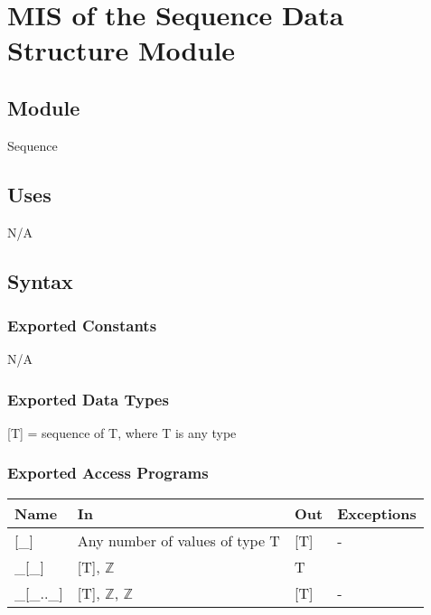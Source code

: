 \documentclass[12pt, titlepage]{article}
\begin{document}

\section{MIS of the Sequence Data Structure Module} \label{sec:SequenceData}

\subsection{Module}
Sequence

\subsection{Uses}

N/A

\subsection{Syntax}

\subsubsection{Exported Constants}
N/A

\subsubsection{Exported Data Types}

[T] = sequence of T, where T is any type

\subsubsection{Exported Access Programs}

\begin{center}
	\renewcommand*{\arraystretch}{1.5}
	\begin{tabular} {p{}  p{}  p{} 
			p{} } \hline 
		\textbf{Name} & \textbf{In} & \textbf{Out} & \textbf{Exceptions} \\ 
		\hline
		
		[\_] & Any number of values of type T & [T] & - \\ 
		\_[\_] & [T], $\mathbb{Z}$ & T & \\
		\_[\_..\_] & [T], $\mathbb{Z}$, $\mathbb{Z}$ & [T] & - \\\hline
	\end{tabular}
\end{center}
\end{document}
